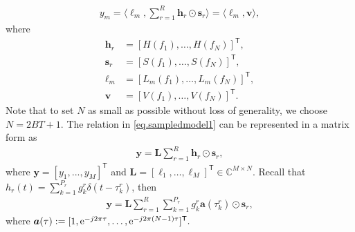 \documentclass[conference,10pt]{IEEEtran}
\theoremstyle{remark}
\theoremstyle{plain}
\theoremstyle{definition}
\theoremstyle{remark}
\begin{document}
 \begin{align}\label{eq.sampledmodel1}
  y_m =  \langle \bm{\ell}_m, \sum_{r=1}^R \bm{h}_r\odot \bm{s}_r \rangle = \langle \bm{\ell}_m, \bm{v} \rangle,
 \end{align}
where 
\begin{align}
    \bm{h}_r & = [H(f_1),\ldots,H(f_N)]^{\mathsf{T}}, \\
     \bm{s}_r & = [S(f_1),\ldots,S(f_N)]^{\mathsf{T}}, \\ 
     \bm{\ell}_m & = [L_m(f_1),\ldots,L_m(f_N)]^{\mathsf{T}}, \\
     \bm{v} & =  [V(f_1),\ldots,V(f_N)]^{\mathsf{T}}.
\end{align}
Note that to set $N$ as small as possible without loss of generality, we choose $N= 2BT + 1$.
The relation in \eqref{eq.sampledmodel1} can be represented in a matrix form as
 \begin{align}
 \bm{y}=\bm{L}\sum_{r=1}^R \bm{h}_r\odot \bm{s}_r,
 \end{align}
 where $\bm{y}=[y_{1},...,y_{M}]^{\mathsf{T}}$ and $\bm{L} = [\bm{\ell}_1,\ldots, \bm{\ell}_M]^{\mathsf{T}} \in \mathbb{C}^{M\times N}$. Recall that $h_r(t) = \sum_{k=1}^{P_r}g_k^r\delta(t-\tau_k^r)$, then 
\begin{align}
    \label{eq.sampledmodel2}
   \bm{y} = \bm{L}\sum_{r=1}^R \sum_{k=1}^{P_r}g_k^r \bm{a}(\tau_k^r)\odot \bm{s}_r,
\end{align}
 where $\bm{a}(\tau):=[1,{\rm e}^{-j2\pi\tau}, \ldots ,{\rm e}^{-j2\pi(N-1)\tau}]^{\mathsf{T}}.$

 
 
\end{document}
